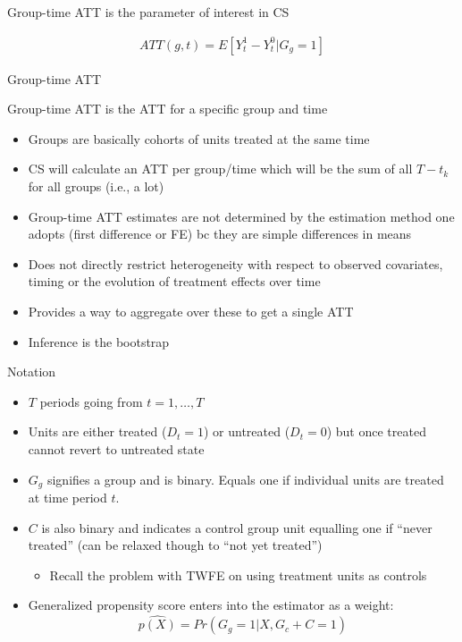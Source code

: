 \documentclass{beamer}
\begin{document}
\begin{frame}{Group-time ATT is the parameter of interest in CS}

\begin{eqnarray*}
ATT(g,t) = E[Y_t^1 - Y_t^0 | G_g=1]
\end{eqnarray*}

\end{frame}


\begin{frame}{Group-time ATT}

Group-time ATT is the ATT for a specific group and time
\begin{itemize}
\item Groups are basically cohorts of units treated at the same time
\item CS will calculate an ATT per group/time which will be the sum of all $T-t_k$ for all groups (i.e., a lot)
\item Group-time ATT estimates are not determined by the estimation method one adopts (first difference or FE) bc they are simple differences in means
\item Does not directly restrict heterogeneity with respect to observed covariates, timing or the evolution of treatment effects over time
\item Provides a way to aggregate over these to get a single ATT
\item Inference is the bootstrap
\end{itemize}

\end{frame}



\begin{frame}{Notation}

\begin{itemize}
\item $T$ periods going from $t=1, \dots, T$
\item Units are either treated ($D_t=1$) or untreated ($D_t=0$) but once treated cannot revert to untreated state
\item $G_g$ signifies a group and is binary.  Equals one if individual units are treated at time period $t$.
\item $C$ is also binary and indicates a control group unit equalling one if ``never treated'' (can be relaxed though to ``not yet treated'')
	\begin{itemize}
	\item Recall the problem with TWFE on using treatment units as controls
	\end{itemize}
\item Generalized propensity score enters into the estimator as a weight: $$\widehat{p(X)} = Pr(G_g=1 | X,G_c+C=1)$$
\end{itemize}

\end{frame}
\end{document}
